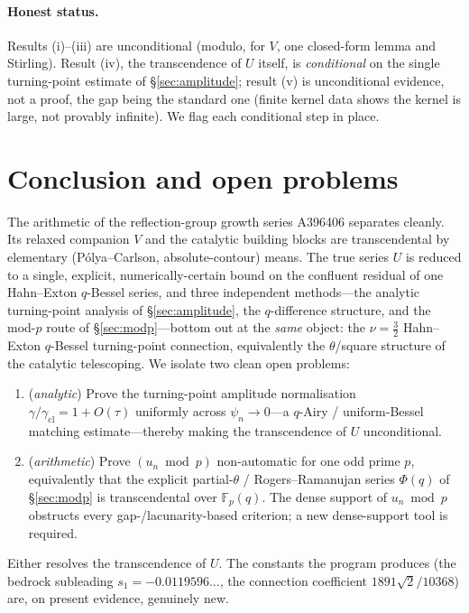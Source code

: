\documentclass[11pt]{article}
\begin{document}
\paragraph{Honest status.} Results (i)--(iii) are unconditional (modulo, for $V$, one closed-form
lemma and Stirling). Result (iv), the transcendence of $U$ itself, is \emph{conditional} on the
single turning-point estimate of \S\ref{sec:amplitude}; result (v) is unconditional evidence,
not a proof, the gap being the standard one (finite kernel data shows the kernel is large, not
provably infinite). We flag each conditional step in place.

\bigskip

\clearpage

\clearpage

\clearpage

\clearpage

\clearpage


\clearpage
\section{Conclusion and open problems}\label{sec:conclusion}
The arithmetic of the reflection-group growth series A396406 separates cleanly. Its relaxed
companion $V$ and the catalytic building blocks are transcendental by elementary
(P\'olya--Carlson, absolute-contour) means. The true series $U$ is reduced to a single,
explicit, numerically-certain bound on the confluent residual of one Hahn--Exton $q$-Bessel
series, and three independent methods---the analytic turning-point analysis of
\S\ref{sec:amplitude}, the $q$-difference structure, and the mod-$p$ route of
\S\ref{sec:modp}---bottom out at the \emph{same} object: the $\nu=\tfrac32$ Hahn--Exton
$q$-Bessel turning-point connection, equivalently the $\theta$/square structure of the catalytic
telescoping. We isolate two clean open problems:
\begin{enumerate}[leftmargin=1.7em,itemsep=0.15em]
\item (\emph{analytic}) Prove the turning-point amplitude normalisation
$\gamma/\gamma_{\mathrm{cl}}=1+O(\tau)$ uniformly across $\psi_n\to0$---a $q$-Airy / uniform-Bessel
matching estimate---thereby making the transcendence of $U$ unconditional.
\item (\emph{arithmetic}) Prove $(u_n\bmod p)$ non-automatic for one odd prime $p$, equivalently
that the explicit partial-$\theta$ / Rogers--Ramanujan series $\Phi(q)$ of \S\ref{sec:modp} is
transcendental over $\mathbb F_p(q)$. The dense support of $u_n\bmod p$ obstructs every
gap-/lacunarity-based criterion; a new dense-support tool is required.
\end{enumerate}
Either resolves the transcendence of $U$. The constants the program produces (the bedrock
subleading $s_1=-0.0119596\ldots$, the connection coefficient $1891\sqrt2/10368$) are, on present
evidence, genuinely new.
\end{document}
